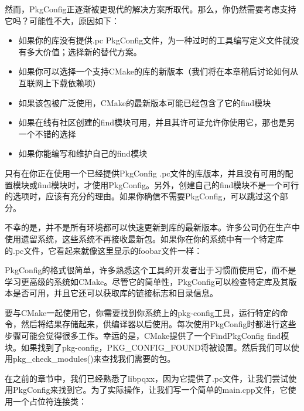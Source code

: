 然而，PkgConfig正逐渐被更现代的解决方案所取代。那么，你仍然需要考虑支持它吗？可能性不大，原因如下：

\begin{itemize}
\item
如果你的库没有提供.pc PkgConfig文件，为一种过时的工具编写定义文件就没有多大价值；选择新的替代方案。

\item
如果你可以选择一个支持CMake的库的新版本（我们将在本章稍后讨论如何从互联网上下载依赖项）

\item
如果该包被广泛使用，CMake的最新版本可能已经包含了它的find模块

\item
如果在线有社区创建的find模块可用，并且其许可证允许你使用它，那也是另一个不错的选择

\item
如果你能编写和维护自己的find模块
\end{itemize}

只有在你正在使用一个已经提供PkgConfig .pc文件的库版本，并且没有可用的配置模块或find模块时，才使用PkgConfig。另外，创建自己的find模块不是一个可行的选项时，应该有充分的理由。如果你确信不需要PkgConfig，可以跳过这个部分。

不幸的是，并不是所有环境都可以快速更新到库的最新版本。许多公司仍在生产中使用遗留系统，这些系统不再接收最新包。如果你在你的系统中有一个特定库的.pc文件，它看起来就像这里显示的foobar文件一样：


PkgConfig的格式很简单，许多熟悉这个工具的开发者出于习惯而使用它，而不是学习更高级的系统如CMake。尽管它的简单性，PkgConfig可以检查特定库及其版本是否可用，并且它还可以获取库的链接标志和目录信息。

要与CMake一起使用它，你需要找到你系统上的pkg-config工具，运行特定的命令，然后将结果存储起来，供编译器以后使用。每次使用PkgConfig时都进行这些步骤可能会觉得很多工作。幸运的是，CMake提供了一个FindPkgConfig find模块。如果找到了pkg-config，PKG\_CONFIG\_FOUND将被设置。然后我们可以使用pkg\_check\_modules()来查找我们需要的包。

在之前的章节中，我们已经熟悉了libpqxx，因为它提供了.pc文件，让我们尝试使用PkgConfig来找到它。为了实际操作，让我们写一个简单的main.cpp文件，它使用一个占位符连接类：

